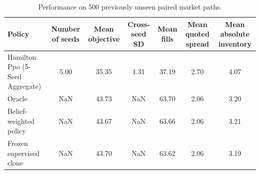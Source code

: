 \begin{table}
\caption{Performance on 500 previously unseen paired market paths.}
\label{tab:phase7-unseen-policy-summary}
\begin{tabular}{lcccccc}
\toprule
Policy & Number of seeds & Mean objective & Cross-seed SD & Mean fills & Mean quoted spread & Mean absolute inventory \\
\midrule
Hamilton Ppo (5-Seed Aggregate) & 5.00 & 35.35 & 1.31 & 37.19 & 2.70 & 4.07 \\
Oracle & NaN & 43.73 & NaN & 63.70 & 2.06 & 3.20 \\
Belief-weighted policy & NaN & 43.67 & NaN & 63.66 & 2.06 & 3.21 \\
Frozen supervised clone & NaN & 43.70 & NaN & 63.62 & 2.06 & 3.19 \\
\bottomrule
\end{tabular}
\end{table}
